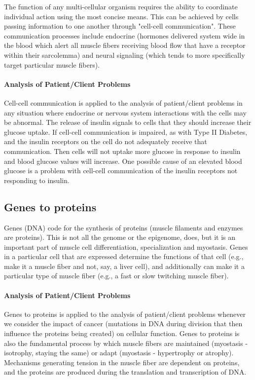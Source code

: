 The function of any multi-cellular organism requires the ability to coordinate individual action using the most concise means. This can be achieved by cells passing information to one another through "cell-cell communication". These communication processes include endocrine (hormones delivered system wide in the blood which alert all muscle fibers receiving blood flow that have a receptor within their sarcolemma) and neural signaling (which tends to more specifically target particular muscle fibers). 

\paragraph{Analysis of Patient/Client Problems}
Cell-cell communication is applied to the analysis of patient/client problems in any situation where endocrine or nervous system interactions with the cells may be abnormal. The release of insulin signals to cells that they should increase their glucose uptake. If cell-cell communication is impaired, as with Type II Diabetes, and the insulin receptors on the cell do not adequately receive that communication. Then cells will not uptake more glucose in response to insulin and blood glucose values will increase. One possible cause of an elevated blood glucose is a problem with cell-cell communication of the insulin receptors not responding to insulin. 

\subsection{Genes to proteins}
Genes (DNA) code for the synthesis of proteins (muscle filaments and enzymes are proteins). This is not all the genome\footnotemark{} or the epigenome\footnotemark{}, does, but it is an important part of muscle cell differentiation, specialization and myostasis. Genes in a particular cell that are expressed determine the functions of that cell (e.g., make it a muscle fiber and not, say, a liver cell), and additionally can make it a particular type of muscle fiber (e.g., a fast or slow twitching muscle fiber).

\paragraph{Analysis of Patient/Client Problems}
Genes to proteins is applied to the analysis of patient/client problems whenever we consider the impact of cancer (mutations in DNA during division that then influence the proteins being created) on cellular function. Genes to proteins is also the fundamental process by which muscle fibers are maintained (myostasis - isotrophy, staying the same) or adapt (myostasis - hypertrophy or atrophy). Mechanisms generating tension in the muscle fiber are dependent on proteins, and the proteins are produced during the translation and transcription of DNA. 

